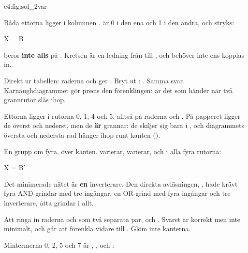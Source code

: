 \leavevmode

%
{c4:fig:sol_2var}

\noindent Båda ettorna ligger i kolumnen .  är 0 i den ena och 1 i den andra,
och stryks:

\begin{console}
X = B
\end{console}

\noindent{} beror \textbf{inte alls} på . Kretsen är en ledning från  till
, och  behöver inte ens kopplas in.

Direkt ur tabellen: raderna  och  ger . Bryt ut
: . Samma svar. Karnaughdiagrammet gör precis den
förenklingen:  är det som händer när två grannrutor slås ihop.

Ettorna ligger i rutorna 0, 1, 4 och 5, alltså på raderna  och
. På papperet ligger de överst och nederst, men de \textbf{är} grannar: de skiljer
sig bara i , och diagrammets översta och nedersta rad hänger ihop runt kanten
().

\leavevmode


\noindent En grupp om fyra, över kanten.  varierar,  varierar, och  i
alla fyra rutorna:

\begin{console}
X = B'
\end{console}

Det minimerade nätet är \textbf{en} inverterare. Den direkta avläsningen,
, hade krävt fyra AND-grindar med tre ingångar, en OR-grind
med fyra ingångar och tre inverterare, åtta grindar i allt.

Att ringa in raderna  och  som två separata par, 
och . Svaret  är korrekt men inte minimalt, och går att förenkla vidare
till . Glöm inte kanterna.

Mintermerna 0, 2, 5 och 7 är , ,  och :

